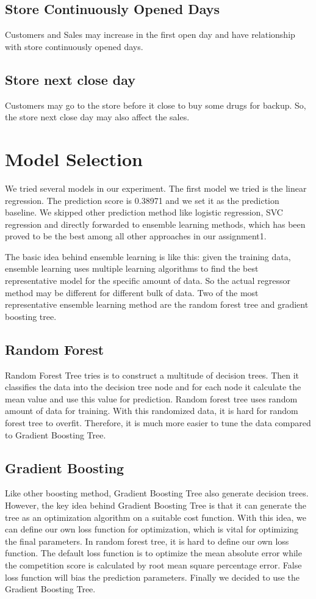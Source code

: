 \documentclass[jou,apacite]{apa6}
\begin{document}
\subsection{Store Continuously Opened Days}
Customers and Sales may increase in the first open day and have relationship with store continuously opened days. 

\subsection{Store next close day}
Customers may go to the store before it close to buy some drugs for backup. So, the store next close day may also affect the sales. 

\section{Model Selection}
We tried several models in our experiment. The first model we tried is the linear regression. The prediction score is 0.38971 and we set it as the prediction baseline. We skipped other prediction method like logistic regression, SVC regression and directly forwarded to ensemble learning methods, which has been proved to be the best among all other approaches in our assignment1.

The basic idea behind ensemble learning is like this: given the training data, ensemble learning uses multiple learning algorithms to find the best representative model for the specific amount of data. So the actual regressor method may be different for different bulk of data. Two of the most representative ensemble learning method are the random forest tree and gradient boosting tree.

\subsection{Random Forest}
Random Forest Tree tries is to construct a multitude of decision trees. Then it classifies the data into the decision tree node and for each node it calculate the mean value and use this value for prediction. Random forest tree uses random amount of data for training. With this randomized data, it is hard for random forest tree to overfit. Therefore, it is much more easier to tune the data compared to Gradient Boosting Tree.

\subsection{Gradient Boosting}
Like other boosting method, Gradient Boosting Tree also generate decision trees. However, the key idea behind Gradient Boosting Tree is that it can generate the tree as an optimization algorithm on a suitable cost function. With this idea, we can define our own loss function for optimization, which is vital for optimizing the final parameters. In random forest tree, it is hard to define our own loss function. The default loss function is to optimize the mean absolute error while the competition score is calculated by root mean square percentage error. False loss function will bias the prediction parameters.
Finally we decided to use the Gradient Boosting Tree. 
\end{document}
